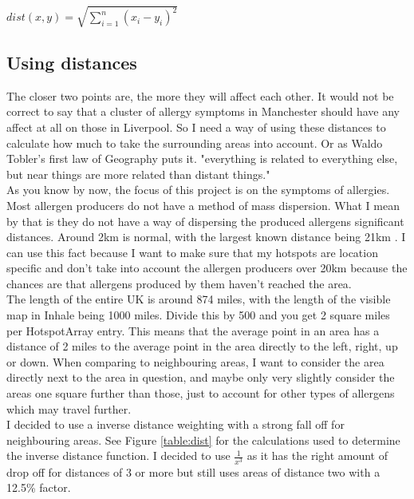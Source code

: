 $dist (x, y)  = \sqrt{\sum_{i=1}^n (x_i - y_i)^2 }$
\label{dia:manhat}

\subsection{Using distances}

The closer two points are, the more they will affect each other. It would not be correct to say that a cluster of allergy symptoms in Manchester should have any affect at all on those in Liverpool. So I need a way of using these distances to calculate how much to take the surrounding areas into account. Or as Waldo Tobler's first law of Geography puts it. "everything is related to everything else, but near things are more related than distant things." \cite{waldo}\\

As you know by now, the focus of this project is on the symptoms  of allergies. Most allergen producers do not have a method of mass dispersion. What I mean by that is they do not have a way of dispersing the produced allergens significant distances. Around 2km is normal, with the largest known distance being 21km \cite{pollenwr}. I can use this fact because I want to make sure that my hotspots are location specific and don't take into account the allergen producers over 20km because the chances are that allergens produced by them haven't reached the area.\\

The length of the entire UK is around 874 miles, with the length of the visible map in Inhale being 1000 miles. Divide this by 500 and you get 2 square miles per HotspotArray entry. This means that the average point in an area has a distance of 2 miles to the average point in the area directly to the left, right, up or down. When comparing to neighbouring areas, I want to consider the area directly next to the area in question, and maybe only very slightly consider the areas one square further than those, just to account for other types of allergens which may travel further.\\

I decided to use a inverse distance weighting with a strong fall off for neighbouring areas. See Figure \ref{table:dist} for the calculations used to determine the inverse distance function. I decided to use $\frac{1}{x^3}$ as it has the right amount of drop off for distances of 3 or more but still uses areas of distance two with a 12.5\% factor.\\ 

